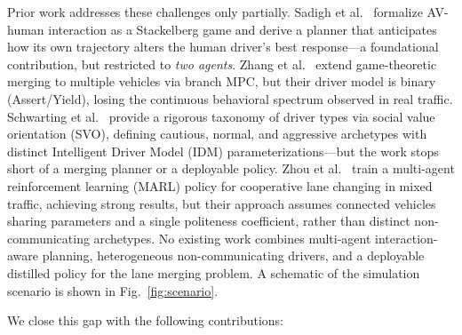 \documentclass[conference]{IEEEtran}
\begin{document}
Prior work addresses these challenges only partially.
Sadigh et al.\ \cite{sadigh2016planning} formalize AV-human interaction as a
Stackelberg game and derive a planner that anticipates how its own trajectory
alters the human driver's best response---a foundational contribution, but
restricted to \emph{two agents}.
Zhang et al.\ \cite{zhang2025multiagent} extend game-theoretic merging to
multiple vehicles via branch MPC, but their driver model is binary
(Assert/Yield), losing the continuous behavioral spectrum observed in real
traffic.
Schwarting et al.\ \cite{schwarting2019social} provide a rigorous taxonomy of
driver types via social value orientation (SVO), defining cautious, normal, and
aggressive archetypes with distinct Intelligent Driver Model (IDM)
\cite{treiber2000congested} parameterizations---but the work stops short of a
merging planner or a deployable policy.
Zhou et al.\ \cite{zhou2022marl} train a multi-agent reinforcement learning
(MARL) policy for cooperative lane changing in mixed traffic, achieving
strong results, but their approach assumes connected vehicles sharing parameters
and a single politeness coefficient, rather than distinct non-communicating
archetypes.
No existing work combines multi-agent interaction-aware planning,
heterogeneous non-communicating drivers, and a deployable distilled policy for
the lane merging problem.
A schematic of the simulation scenario is shown in Fig.~\ref{fig:scenario}.

We close this gap with the following contributions:
\end{document}
